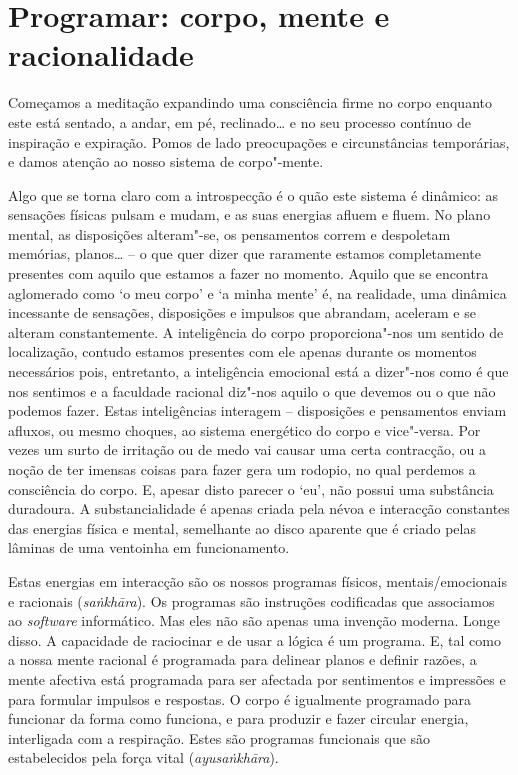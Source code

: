 \section{Programar: corpo, mente e racionalidade}

Começamos a meditação expandindo uma consciência firme no corpo enquanto este
está sentado, a andar, em pé, reclinado\ldots{} e no seu processo contínuo de
inspiração e expiração. Pomos de lado preocupações e circunstâncias temporárias,
e damos atenção ao nosso sistema de corpo"-mente.

Algo que se torna claro com a introspecção é o quão este sistema é dinâmico: as
sensações físicas pulsam e mudam, e as suas energias afluem e fluem. No plano
mental, as disposições alteram"-se, os pensamentos correm e despoletam memórias,
planos\ldots{} -- o que quer dizer que raramente estamos completamente presentes com
aquilo que estamos a fazer no momento. Aquilo que se encontra aglomerado como `o
meu corpo' e `a minha mente' é, na realidade, uma dinâmica incessante de
sensações, disposições e impulsos que abrandam, aceleram e se alteram
constantemente. A inteligência do corpo proporciona"-nos um sentido de
localização, contudo estamos presentes com ele apenas durante os momentos
necessários pois, entretanto, a inteligência emocional está a dizer"-nos como é
que nos sentimos e a faculdade racional diz"-nos aquilo o que devemos ou o que
não podemos fazer. Estas inteligências interagem -- disposições e pensamentos
enviam afluxos, ou mesmo choques, ao sistema energético do corpo e vice"-versa.
Por vezes um surto de irritação ou de medo vai causar uma certa contracção, ou a
noção de ter imensas coisas para fazer gera um rodopio, no qual perdemos a
consciência do corpo. E, apesar disto parecer o `eu', não possui uma substância
duradoura. A substancialidade é apenas criada pela névoa e interacção constantes
das energias física e mental, semelhante ao disco aparente que é criado pelas
lâminas de uma ventoinha em funcionamento.

Estas energias em interacção são os nossos programas físicos, mentais/emocionais
e racionais (\emph{saṅkhāra}). Os programas são instruções codificadas que
associamos ao \emph{software} informático. Mas eles não são apenas uma invenção
moderna. Longe disso. A capacidade de raciocinar e de usar a lógica é um
programa. E, tal como a nossa mente racional é programada para delinear planos e
definir razões, a mente afectiva está programada para ser afectada por
sentimentos e impressões e para formular impulsos e respostas. O corpo é
igualmente programado para funcionar da forma como funciona, e para produzir e
fazer circular energia, interligada com a respiração. Estes são programas
funcionais que são estabelecidos pela força vital (\emph{ayusaṅkhāra}).

